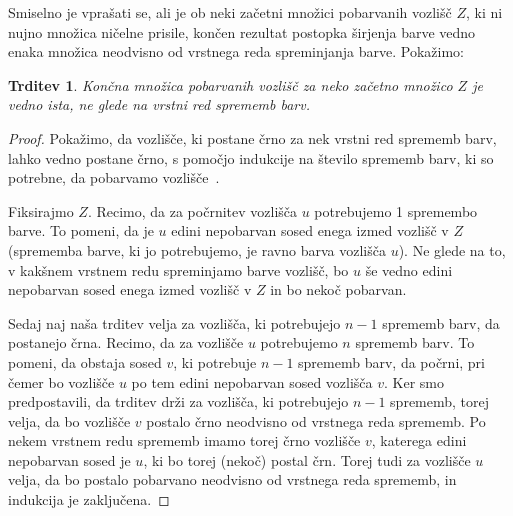 \documentclass[12pt,a4paper,twoside]{article}
\theoremstyle{definition} %
\theoremstyle{plain} %
\newtheorem{trditev}[definicija]{Trditev}
\numberwithin{equation}{section}  %
\begin{document}
Smiselno je vprašati se, ali je ob neki začetni množici pobarvanih vozlišč $Z$, ki ni nujno množica ničelne prisile, končen rezultat postopka širjenja barve vedno enaka množica neodvisno od vrstnega reda spreminjanja barve. Pokažimo:
\begin{trditev}
    Končna množica pobarvanih vozlišč za neko začetno množico $Z$ je vedno ista, ne glede na vrstni red sprememb barv. 
\end{trditev}
\begin{proof}
    Pokažimo, da vozlišče, ki postane črno za nek vrstni red sprememb barv, lahko vedno postane črno, s pomočjo indukcije na število sprememb barv, ki so potrebne, da pobarvamo vozlišče~\cite[str.~1633]{aim2008minimumrank}. 
    
    Fiksirajmo $Z$. Recimo, da za počrnitev vozlišča $u$ potrebujemo 1 spremembo barve. To pomeni, da je $u$ edini nepobarvan sosed enega izmed vozlišč v $Z$ (sprememba barve, ki jo potrebujemo, je ravno barva vozlišča $u$). Ne glede na to, v kakšnem vrstnem redu spreminjamo barve vozlišč, bo $u$ še vedno edini nepobarvan sosed enega izmed vozlišč v $Z$ in bo nekoč pobarvan.
    
    Sedaj naj naša trditev velja za vozlišča, ki potrebujejo $n-1$ sprememb barv, da postanejo črna. Recimo, da za vozlišče $u$ potrebujemo $n$ sprememb barv. To pomeni, da obstaja sosed $v$, ki potrebuje $n-1$ sprememb barv, da počrni, pri čemer bo vozlišče $u$ po tem edini nepobarvan sosed vozlišča $v$. Ker smo predpostavili, da trditev drži za vozlišča, ki potrebujejo $n-1$ sprememb, torej velja, da bo vozlišče $v$ postalo črno neodvisno od vrstnega reda sprememb. Po nekem vrstnem redu sprememb imamo torej črno vozlišče $v$, katerega edini nepobarvan sosed je $u$, ki bo torej (nekoč) postal črn. Torej tudi za vozlišče $u$ velja, da bo postalo pobarvano neodvisno od vrstnega reda sprememb, in indukcija je zaključena.
\end{proof}
\end{document}
